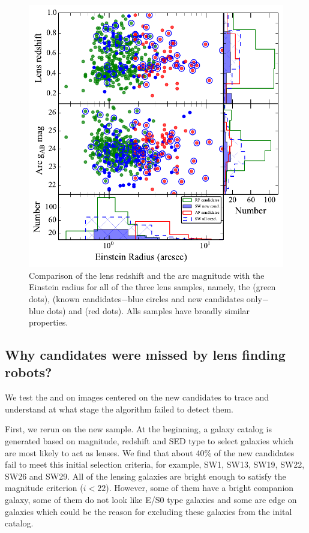 \documentclass[useAMS,usenatbib,a4paper]{mn2e}
\begin{document}
\begin{figure}
\begin{center}
\includegraphics[scale=0.65]{sw-cfhtls-figs/zl_mg_re.pdf}
\caption{ \label{fig:zlmgre}
Comparison of the lens redshift and the arc magnitude with the
Einstein radius for all of the three lens samples, namely, the \rf (green dots),
\sw (known candidates$-$blue circles and new candidates only$-$blue dots)
and \af (red dots). Alls samples have broadly similar properties.}
\end{center}
\end{figure}

\subsection{Why \sw candidates were missed by lens finding robots?}
We test the \rf and \af on images centered on the new \sw candidates to
trace and understand at what stage the algorithm failed to detect them.

First, we rerun \rf on the new \sw sample. At the beginning, a galaxy
catalog is generated based on magnitude, redshift and SED type
\citep[see]{Gavazzi2014} to select galaxies which are most likely to act
as lenses. We find that about 40\% of the new \sw candidates fail to
meet this initial selection criteria, for example, SW1, SW13, SW19,
SW22, SW26 and SW29.  All of the lensing galaxies are bright enough to
satisfy the magnitude criterion ($i<22$). However, some of them have a
bright companion galaxy, some of them do not look like E/S0 type
galaxies and some are edge on galaxies which could be the reason for
excluding these galaxies from the inital catalog.
\end{document}
